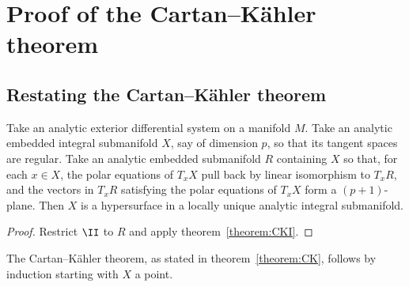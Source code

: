 \chapter{Proof of the Cartan--K\"ahler theorem}
\section{Restating the Cartan--K\"ahler theorem}
\begin{theorem}
Take an analytic exterior differential system on a manifold \(M\).
Take an analytic embedded integral submanifold \(X\), say of dimension \(p\), so that its tangent spaces are regular.
Take an analytic embedded submanifold \(R\) containing \(X\) so that, for each \(x \in X\), the polar equations of \(T_x X\) pull back by linear isomorphism to \(T_x R\), and the vectors in \(T_x R\) satisfying the polar equations of \(T_x X\) form a \((p+1)\)-plane.
Then \(X\) is a hypersurface in a locally unique analytic integral submanifold.
\end{theorem}
\begin{proof}
Restrict \(\II\) to \(R\) and apply theorem~\vref{theorem:CKI}.
\end{proof}
The Cartan--K\"ahler theorem, as stated in theorem~\vref{theorem:CK}, follows by induction starting with \(X\) a point.

